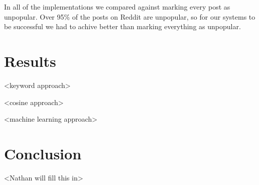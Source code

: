 \documentclass{acm_proc_article-sp}
\begin{document}
In all of the implementations we compared against marking every post as unpopular. Over 95\% of the posts on Reddit are unpopular, so for our systems to be successful we had to achive better than marking everything as unpopular. 

\section{Results}

<keyword approach>

<cosine approach>

<machine learning approach>



\section{Conclusion}

<Nathan will fill this in>

%

%
%


\end{document}
